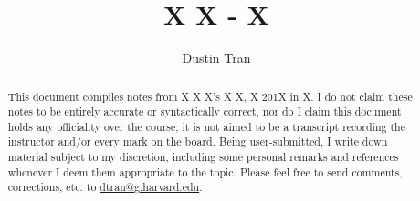 \documentclass{amsart}
\begin{document}
\title{X X - X}
\author[Tran]{Dustin Tran}

\begin{abstract}
This document compiles notes from X X X's X X, X 201X in X. I do not claim these
notes to be entirely accurate or syntactically correct, nor do I claim this
document holds any officiality over the course; it is not aimed to be a
transcript recording the instructor and/or every mark on the board. Being
user-submitted, I write down material subject to my discretion, including some
personal remarks and references whenever I deem them appropriate to the topic.
Please feel free to send comments, corrections, etc. to
\href{mailto:dtran@g.harvard.edu}{dtran@g.harvard.edu}.
\end{abstract}
\maketitle

\tableofcontents

%
%
%
%
%
%
%
%
%
%
%
%
%
%
%
%
%
%
%
%
%
%
%
%
%
%
%
%
%
%
%
%
%
%
%
%
%
%
%
%
%
%
%
%
%
%
%
%
%
%

\end{document}
